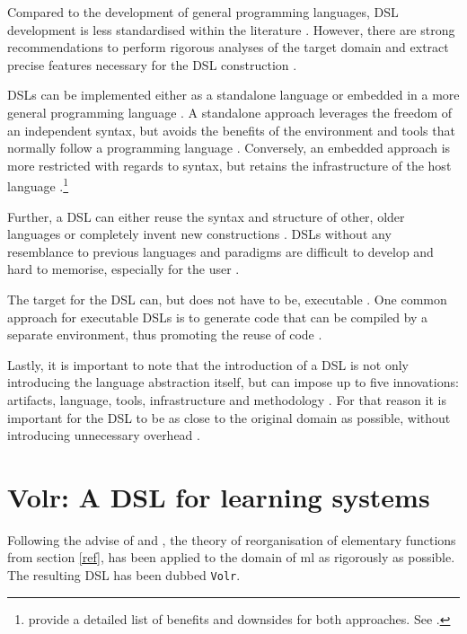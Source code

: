 \documentclass[a4paper,oneside]{memoir}
\begin{document}
Compared to the development of general programming languages, DSL development
is less standardised within the literature \autocite{Mernik2005, Deursen2002}.
However, there are strong recommendations to perform rigorous analyses of the
target domain and extract precise features necessary for the DSL construction
\autocite{Mernik2005, Deursen2002}.

DSLs can be implemented either as a standalone language or embedded in a more
general programming language \autocite{Mernik2005}. A standalone approach
leverages the freedom of an independent syntax, but avoids the benefits of
the environment and tools that normally follow a programming language
\autocite{Mernik2005, Sestoft2017}. Conversely, an embedded approach is
more restricted with regards to syntax, but retains the infrastructure of the
host language \autocite{Mernik2005}.\footnote{\cite{Mernik2005} provide a detailed list of
 benefits and downsides for both approaches. See
\autocite[330-331]{Mernik2005}.}

Further, a DSL can either reuse the syntax and structure of other, older
languages or completely invent new constructions
\autocite{Mernik2005, Deursen2002}. DSLs without any resemblance to previous
languages and paradigms are difficult to develop and hard to memorise,
especially for the user \autocite{Wile2004}.

The target for the DSL can, but does not have to be, executable
\autocite{Mernik2005}. One common approach for executable DSLs
is to generate code that can be compiled by a separate environment, thus
promoting the reuse of code \autocite{Wile2004}.

Lastly, it is important to note that the introduction of a DSL is not only
introducing the language abstraction itself, but can impose up to five
innovations: artifacts, language, tools, infrastructure and methodology
\autocite{Wile2004}. For that reason it is important for the DSL to be as
close to the original domain as possible, without introducing unnecessary
overhead \autocite{Wile2004, Mernik2005}.

{\let\clearpage\relax\chapter{Volr: A DSL for learning systems}}
\label{volr}

Following the advise of \cite{Mernik2005} and \cite{Wile2004}, the theory of
reorganisation of elementary functions from section \ref{ref}, has been
applied to the domain of \gls{ml} as rigorously as possible.
The resulting DSL has been dubbed \texttt{Volr}.
\end{document}
